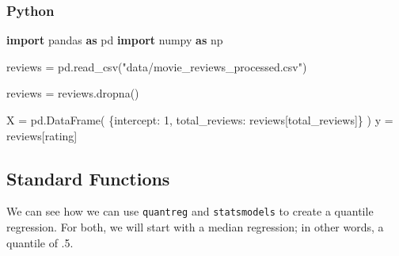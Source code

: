 \documentclass[
  letterpaper,
]{krantz}
\newenvironment{Shaded}{}{}
\newcommand{\DecValTok}[1]{\textcolor[rgb]{0.25,0.63,0.44}{#1}}
\newcommand{\FunctionTok}[1]{\textcolor[rgb]{0.02,0.16,0.49}{#1}}
\newcommand{\ImportTok}[1]{\textcolor[rgb]{0.00,0.50,0.00}{\textbf{#1}}}
\newcommand{\NormalTok}[1]{#1}
\newcommand{\OperatorTok}[1]{\textcolor[rgb]{0.40,0.40,0.40}{#1}}
\newcommand{\OtherTok}[1]{\textcolor[rgb]{0.00,0.44,0.13}{#1}}
\newcommand{\SpecialCharTok}[1]{\textcolor[rgb]{0.25,0.44,0.63}{#1}}
\newcommand{\StringTok}[1]{\textcolor[rgb]{0.25,0.44,0.63}{#1}}
\begin{document}
\begin{Shaded}
\end{Shaded}

\subsubsection{Python}

\begin{Shaded}
\begin{Highlighting}[]
\ImportTok{import}\NormalTok{ pandas }\ImportTok{as}\NormalTok{ pd}
\ImportTok{import}\NormalTok{ numpy }\ImportTok{as}\NormalTok{ np}

\NormalTok{reviews }\OperatorTok{=}\NormalTok{ pd.read\_csv(}\StringTok{"data/movie\_reviews\_processed.csv"}\NormalTok{)}

\NormalTok{reviews }\OperatorTok{=}\NormalTok{ reviews.dropna()}

\NormalTok{X }\OperatorTok{=}\NormalTok{ pd.DataFrame(}
\NormalTok{  \{}\StringTok{\textquotesingle{}intercept\textquotesingle{}}\NormalTok{: }\DecValTok{1}\NormalTok{, }
  \StringTok{\textquotesingle{}total\_reviews\textquotesingle{}}\NormalTok{: reviews[}\StringTok{\textquotesingle{}total\_reviews\textquotesingle{}}\NormalTok{]\}}
\NormalTok{)}
\NormalTok{y }\OperatorTok{=}\NormalTok{ reviews[}\StringTok{\textquotesingle{}rating\textquotesingle{}}\NormalTok{]}
\end{Highlighting}
\end{Shaded}

\subsection{Standard Functions}\label{standard-functions-2}

We can see how we can use \texttt{quantreg} and \texttt{statsmodels} to
create a quantile regression. For both, we will start with a median
regression; in other words, a quantile of .5.
\end{document}
